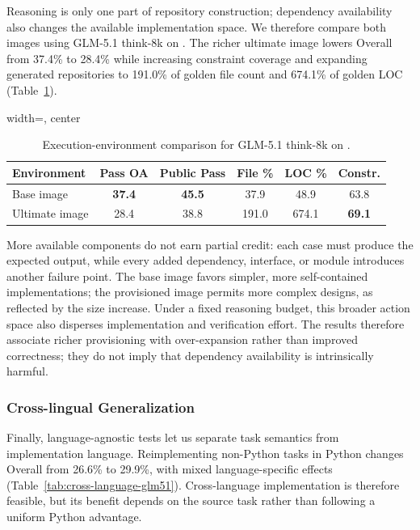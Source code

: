 Reasoning is only one part of repository construction; dependency availability also changes the available implementation space. We therefore compare both images using GLM-5.1 think-8k on \rcblite{}. The richer ultimate image lowers Overall from 37.4\% to 28.4\% while increasing constraint coverage and expanding generated repositories to 191.0\% of golden file count and 674.1\% of golden LOC (Table~\ref{tab:environment}).

\begin{table}[t]
\centering
\caption{Execution-environment comparison for GLM-5.1 think-8k on \rcblite{}.}
\label{tab:environment}
\small
\begin{adjustbox}{width=\linewidth, center}
\begin{tabular}{lccccc}
\toprule
Environment & Pass OA & Public Pass & File \% & LOC \% & Constr. \\
\midrule
Base image & \textbf{37.4} & \textbf{45.5} & 37.9 & 48.9 & 63.8 \\
Ultimate image & 28.4 & 38.8 & 191.0 & 674.1 & \textbf{69.1} \\
\bottomrule
\end{tabular}
\end{adjustbox}
\end{table}

More available components do not earn partial credit: each case must produce the expected output, while every added dependency, interface, or module introduces another failure point. The base image favors simpler, more self-contained implementations; the provisioned image permits more complex designs, as reflected by the size increase. Under a fixed reasoning budget, this broader action space also disperses implementation and verification effort. The results therefore associate richer provisioning with over-expansion rather than improved correctness; they do not imply that dependency availability is intrinsically harmful.

\subsubsection{Cross-lingual Generalization}
\label{sec:cross-lingual}

Finally, language-agnostic tests let us separate task semantics from implementation language. Reimplementing non-Python tasks in Python changes Overall from 26.6\% to 29.9\%, with mixed language-specific effects (Table~\ref{tab:cross-language-glm51}). Cross-language implementation is therefore feasible, but its benefit depends on the source task rather than following a uniform Python advantage.


